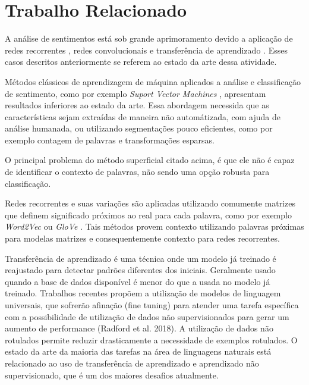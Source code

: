 \documentclass[12pt]{article}
\begin{document}
\section{Trabalho Relacionado} \label{sec:relacionado}

A análise de sentimentos está sob grande aprimoramento devido a aplicação de redes recorrentes \cite{karpathy:2015}, redes convolucionais \cite{lecun:98} e transferência de aprendizado \cite{DBLP:journals/corr/abs-1801-06146}. Esses casos descritos anteriormente se referem ao estado da arte dessa atividade.

Métodos clássicos de aprendizagem de máquina aplicados a análise e classificação de sentimento, como por exemplo \textit{Suport Vector Machines} \cite{DBLP:journals/ml/CortesV95}, apresentam resultados inferiores ao estado da arte. Essa abordagem necessida que as características sejam extraídas de maneira não automátizada, com ajuda de análise humanada, ou utilizando segmentações pouco eficientes, como por exemplo contagem de palavras e transformações esparsas.

O principal problema do método superficial citado acima, é que ele não é capaz de identificar o contexto de palavras, não sendo uma opção robusta para classificação.

Redes recorrentes e suas variações são aplicadas utilizando comumente matrizes que definem significado próximos ao real para cada palavra, como por exemplo \textit{Word2Vec} \cite{DBLP:journals/corr/abs-1301-3781} ou \textit{GloVe} \cite{pennington2014glove}. Tais métodos provem contexto utilizando palavras próximas para modelas matrizes e consequentemente contexto para redes recorrentes.

Transferência de aprendizado é uma técnica onde um modelo já treinado é reajustado para detectar padrões diferentes dos iniciais. Geralmente usado quando a base de dados disponível é menor do que a usada no modelo já treinado. Trabalhos recentes propõem a utilização de modelos de linguagem universais, que sofrerão afinação (fine tuning) para atender uma tarefa específica \cite{DBLP:journals/corr/abs-1801-06146} com a possibilidade de utilização de dados não supervisionados para gerar um aumento de performance (Radford et al. 2018). A utilização de dados não rotulados permite reduzir drasticamente a necessidade de exemplos rotulados. O estado da arte da maioria das tarefas na área de linguagens naturais está relacionado ao uso de transferência de aprendizado e aprendizado não supervisionado, que é um dos maiores desafios atualmente.
\end{document}
